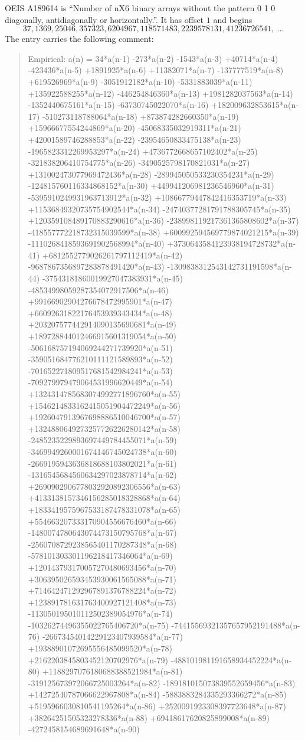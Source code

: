 \documentclass[11pt,a4paper]{article}
\theoremstyle{plain}
\theoremstyle{definition}
\begin{document}
OEIS A189614 is ``Number of nX6 binary arrays without the pattern 0 1 0 diagonally, antidiagonally or horizontally.''. It has offset $1$ and begins
\[
37, 1369, 25046, 357323, 6204967, 118571483, 2239578131, 41236726541,\ \dots
\]
The entry carries the following comment:
\begin{quote}\small
Empirical: a(n) = 34*a(n-1) -273*a(n-2) -1543*a(n-3) +40714*a(n-4) -423436*a(n-5) +1891925*a(n-6) +11382071*a(n-7) -137777519*a(n-8) +619526969*a(n-9) -3051912182*a(n-10) -5331883039*a(n-11) +135922588255*a(n-12) -446254846360*a(n-13) +1981282037563*a(n-14) -1352440675161*a(n-15) -63730745022070*a(n-16) +182009632853615*a(n-17) -510273118788064*a(n-18) +873874282660350*a(n-19) +15966677554244869*a(n-20) -45068335032919311*a(n-21) +42001589746288853*a(n-22) -23954650833475138*a(n-23) -1965823312269953297*a(n-24) +4736772668657102402*a(n-25) -321838206410754775*a(n-26) -3490525798170821031*a(n-27) +131002473077969472436*a(n-28) -289945050533230354231*a(n-29) -124815760116334868152*a(n-30) +449941206981236546960*a(n-31) -5395910249931963713912*a(n-32) +10866779447842416353719*a(n-33) +11536849320735754902544*a(n-34) -24740377281791788305745*a(n-35) +120359108489170883290616*a(n-36) -238998119217361365808602*a(n-37) -418557772218732315039599*a(n-38) +600992594569779874021215*a(n-39) -1110268418593691902568994*a(n-40) +3730643584123938194728732*a(n-41) +6812552779026261797112419*a(n-42) -9687867356897283878491420*a(n-43) -1309838312543142731191598*a(n-44) -37543181860019927047383931*a(n-45) -48534998059287354072917506*a(n-46) +99166902904276678472995901*a(n-47) +66092631822176453939343434*a(n-48) +203207577442914090135690681*a(n-49) +189728844012466915601319054*a(n-50) -506168757194069244271739920*a(n-51) -359051684776210111121589893*a(n-52) -701652271809517681542984241*a(n-53) -709279979479064531996620449*a(n-54) +1324314785683074992771896760*a(n-55) +1546214833162415051904472249*a(n-56) +1926047913967698886510046700*a(n-57) +1324880649273257726226280142*a(n-58) -2485235229893697449784455071*a(n-59) -3469949260001674146745024738*a(n-60) -2669195943636818688103802021*a(n-61) -1316545684560634297023878714*a(n-62) +2690902906778032920892306556*a(n-63) +4133138157346156285018328868*a(n-64) +1833419575967533187478331078*a(n-65) +554663207333170904556676460*a(n-66) -1480074780643074473150795768*a(n-67) -2560708729238565401170287348*a(n-68) -578101303301196218417346064*a(n-69) +120143793170057270480693456*a(n-70) +306395026593453930061565088*a(n-71) +714642471292967891376788224*a(n-72) +123891781631763400927121408*a(n-73) -113050195010112502389054976*a(n-74) -10326274496355022765406720*a(n-75) -74415569321357657952191488*a(n-76) -26673454014229123407939584*a(n-77) +19388901072695556485099520*a(n-78) +2162203845803452120702976*a(n-79) -488101981191658934452224*a(n-80) +1188297076180688388521984*a(n-81) -319125673972066725003264*a(n-82) -189181015073839552659456*a(n-83) +14272540787066622967808*a(n-84) -5883883284335293366272*a(n-85) +5195966030810541195264*a(n-86) +2520091923308397723648*a(n-87) +38264251505323278336*a(n-88) +69418617620825899008*a(n-89) -4272458154689691648*a(n-90)
\end{quote}
\end{document}
